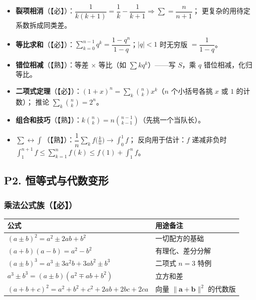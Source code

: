 \begin{itemize}
  \item \textbf{裂项相消}（【必】）：$\dfrac{1}{k(k+1)}=\dfrac1k-\dfrac1{k+1}\Rightarrow\sum=\dfrac{n}{n+1}$；
        更复杂的用待定系数拆成同类差。
  \item \textbf{等比求和}（【必】）：$\sum_{k=0}^{n-1}q^k=\dfrac{1-q^n}{1-q}$；$|q|<1$ 时无穷版 $=\dfrac{1}{1-q}$。
  \item \textbf{错位相减}（【熟】）：等差 $\times$ 等比（如 $\sum k q^k$）——写 $S$，乘 $q$ 错位相减，化归等比。
  \item \textbf{二项式定理}（【必】）：$(1+x)^n=\sum_k\binom{n}{k}x^k$（$n$ 个小括号各挑 $x$ 或 $1$ 的计数）；
        推论 $\sum_k\binom{n}{k}=2^n$。
  \item \textbf{组合和技巧}（【熟】）：$k\binom{n}{k}=n\binom{n-1}{k-1}$（先挑一个当队长）。
  \item \textbf{$\sum \leftrightarrow \int$}（【熟】）：$\dfrac1n\sum_k f\!\big(\tfrac kn\big)\to\int_0^1 f$；
        反向用于估计：$f$ 递减非负时 $\int_1^{n+1}f\le\sum_{k=1}^n f(k)\le f(1)+\int_1^n f$。
\end{itemize}

\subsection{P2. 恒等式与代数变形}

\subsubsection{乘法公式族（【必】）}

\begin{center}
\begin{tabular}{ll}
\toprule
\textbf{公式} & \textbf{用途备注} \\
\midrule
$(a\pm b)^2=a^2\pm 2ab+b^2$ & 一切配方的基础 \\
$(a+b)(a-b)=a^2-b^2$ & 有理化、差分分解 \\
$(a\pm b)^3=a^3\pm3a^2b+3ab^2\pm b^3$ & 二项式 $n=3$ 特例 \\
$a^3\pm b^3=(a\pm b)(a^2\mp ab+b^2)$ & 立方和差 \\
$(a+b+c)^2=a^2+b^2+c^2+2ab+2bc+2ca$ & 向量 $\|\mathbf{a}+\mathbf{b}\|^2$ 的代数版 \\
\bottomrule
\end{tabular}
\end{center}


